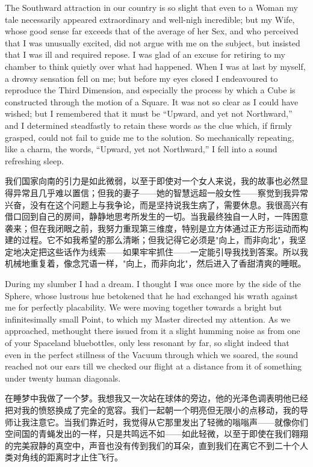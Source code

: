 \documentclass[12pt,UTF8]{ctexbook}
\begin{document}
The Southward attraction in our country is so slight that even to a Woman my tale necessarily appeared extraordinary and well-nigh incredible; but my Wife, whose good sense far exceeds that of the average of her Sex, and who perceived that I was unusually excited, did not argue with me on the subject, but insisted that I was ill and required repose. I was glad of an excuse for retiring to my chamber to think quietly over what had happened. When I was at last by myself, a drowsy sensation fell on me; but before my eyes closed I endeavoured to reproduce the Third Dimension, and especially the process by which a Cube is constructed through the motion of a Square. It was not so clear as I could have wished; but I remembered that it must be ``Upward, and yet not Northward,'' and I determined steadfastly to retain these words as the clue which, if firmly grasped, could not fail to guide me to the solution. So mechanically repeating, like a charm, the words, ``Upward, yet not Northward,'' I fell into a sound refreshing sleep.

我们国家向南的引力是如此微弱，以至于即使对一个女人来说，我的故事也必然显得异常且几乎难以置信；但我的妻子——她的智慧远超一般女性——察觉到我异常兴奋，没有在这个问题上与我争论，而是坚持说我生病了，需要休息。我很高兴有借口回到自己的房间，静静地思考所发生的一切。当我最终独自一人时，一阵困意袭来；但在我闭眼之前，我努力重现第三维度，特别是立方体通过正方形运动而构建的过程。它不如我希望的那么清晰；但我记得它必须是"向上，而非向北"，我坚定地决定把这些话作为线索——如果牢牢抓住——一定能引导我找到答案。所以我机械地重复着，像念咒语一样，"向上，而非向北"，然后进入了香甜清爽的睡眠。

During my slumber I had a dream. I thought I was once more by the side of the Sphere, whose lustrous hue betokened that he had exchanged his wrath against me for perfectly placability. We were moving together towards a bright but infinitesimally small Point, to which my Master directed my attention. As we approached, methought there issued from it a slight humming noise as from one of your Spaceland bluebottles, only less resonant by far, so slight indeed that even in the perfect stillness of the Vacuum through which we soared, the sound reached not our ears till we checked our flight at a distance from it of something under twenty human diagonals.

在睡梦中我做了一个梦。我想我又一次站在球体的旁边，他的光泽色调表明他已经把对我的愤怒换成了完全的宽容。我们一起朝一个明亮但无限小的点移动，我的导师让我注意它。当我们靠近时，我觉得从它那里发出了轻微的嗡嗡声——就像你们空间国的青蝇发出的一样，只是共鸣远不如——如此轻微，以至于即使在我们翱翔的完美寂静的真空中，声音也没有传到我们的耳朵，直到我们在离它不到二十个人类对角线的距离时才止住飞行。
\end{document}
